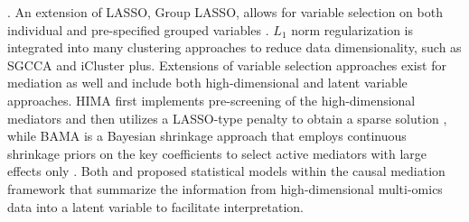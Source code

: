 \citep{tibshirani1996regression}. An extension of LASSO, Group LASSO, allows
for variable selection on both individual and pre-specified grouped
variables \citep{yuan2006model}. \(L_1\) norm regularization is integrated into
many clustering approaches to reduce data dimensionality, such as SGCCA
and iCluster plus. Extensions of variable selection approaches exist for
mediation as well and include both high-dimensional and latent variable
approaches. HIMA first implements pre-screening of the high-dimensional
mediators and then utilizes a LASSO-type penalty to obtain a sparse
solution \citep{zhang2016estimating}, while BAMA is a Bayesian shrinkage
approach that employs continuous shrinkage priors on the key
coefficients to select active mediators with large effects only
\citep{song2020bayesian}. Both \citet{albert2016causal} and \citet{derkach2019high}
proposed statistical models within the causal mediation framework that
summarize the information from high-dimensional multi-omics data into a
latent variable to facilitate interpretation.

